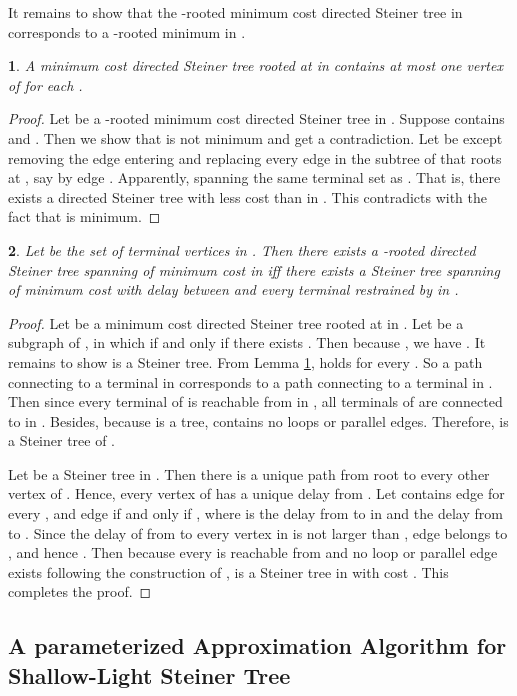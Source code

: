 \documentclass[english,runningheads,a4paper]{llncs}
\newtheorem{thm}{\protect\theoremname}
\newtheorem{lem}[thm]{\protect\lemmaname}
\providecommand{\lemmaname}{Lemma}
\providecommand{\theoremname}{Theorem}
\begin{document}
It remains to show that the -rooted minimum cost directed Steiner
tree in  corresponds to a -rooted minimum  in .
\begin{lem}
\label{lem:degree}A minimum cost directed Steiner tree rooted at
 in  contains at most one vertex of 
for each .\end{lem}
\begin{proof}
Let  be a -rooted minimum cost directed Steiner tree in .
Suppose  contains  and . Then we
show that  is not minimum and get a contradiction. Let  be
 except removing the edge entering  and replacing
every edge in the subtree of  that roots at ,
say 
by edge . Apparently,
 spanning the same terminal set as . That is, there exists
a directed Steiner tree  with less cost than  in . This
contradicts with the fact that  is minimum.\end{proof}
\begin{thm}
\label{thm:acyclic}Let  be the set of terminal vertices 
in . Then there exists a -rooted directed Steiner tree spanning
 of minimum cost  in  iff there exists a Steiner tree
spanning  of minimum cost  with delay between  and every
terminal restrained by  in .\end{thm}
\begin{proof}
Let  be a minimum cost directed Steiner tree rooted at  in
. Let  be a subgraph of , in which 
if and only if there exists .
Then because , we
have . It remains to show  is a Steiner tree. From
Lemma \ref{lem:degree}, 
holds for every . So a path connecting  to a terminal in 
corresponds to a path connecting  to a terminal in .  Then
since every terminal of  is reachable from  in , all
terminals of  are connected to  in . Besides, because
 is a tree,  contains no loops or parallel edges. Therefore,
 is a Steiner tree of .

Let  be a Steiner tree in . Then there is a unique path from
root  to every other vertex of . Hence, every vertex of 
has a unique delay from . Let  contains edge 
for every , and edge 
if and only if , where  is the delay
from  to  in  and  the delay from
 to . Since the delay of from  to every vertex
in  is not larger than , edge 
belongs to , and hence . Then because every 
is reachable from  and no loop or parallel edge exists following
the construction of ,  is a Steiner tree in  with cost
. This completes the proof.
\end{proof}

\subsection{A parameterized Approximation Algorithm for Shallow-Light Steiner
Tree }
\end{document}
